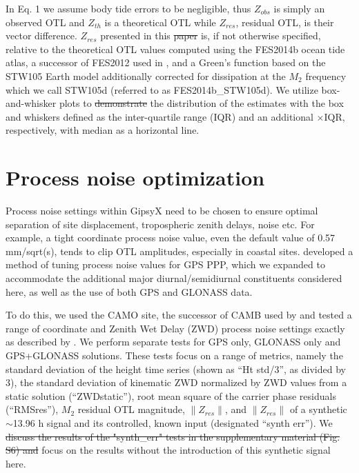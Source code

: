 \documentclass[se, manuscript]{copernicus}
\providecommand{\DIFadd}[1]{{\protect\color{blue}\uwave{#1}}} %
\providecommand{\DIFdel}[1]{{\protect\color{red}\sout{#1}}}                      %
\providecommand{\DIFaddbegin}{} %
\providecommand{\DIFaddend}{} %
\providecommand{\DIFdelbegin}{} %
\providecommand{\DIFdelend}{} %
\begin{document}
In Eq. 1 we assume body tide errors to be negligible, thus $Z_{obs}$ is simply an observed OTL and $Z_{th}$ is a theoretical OTL while $Z_{res}$, \DIFaddbegin \DIFadd{the }\DIFaddend residual OTL, is their vector difference. $Z_{res}$ presented in this \DIFdelbegin \DIFdel{paper }\DIFdelend \DIFaddbegin \DIFadd{publication }\DIFaddend is, if not otherwise specified, relative to the theoretical OTL values computed using the FES2014b ocean tide atlas, a successor of FES2012 used in \cite{Bos2015}, and a Green’s function based on the STW105 Earth model additionally corrected for dissipation at the $M_2$ frequency which we call STW105d (referred to as FES2014b\_STW105d). We utilize box-and-whisker plots to \DIFdelbegin \DIFdel{demonstrate }\DIFdelend \DIFaddbegin \DIFadd{visualise }\DIFaddend the distribution of the estimates with the box and whiskers defined as the inter-quartile range (IQR) and an additional $\times \text{IQR}$, respectively, with \DIFaddbegin \DIFadd{the }\DIFaddend median as a horizontal line.

\section{Process noise optimization}
Process noise settings within GipsyX need to be chosen to ensure optimal separation of site displacement, tropospheric zenith delays, noise etc. For example, a tight coordinate process noise value, even the default value of 0.57 mm/sqrt(s), tends to clip OTL amplitudes, especially in coastal sites. \cite{Penna2015} developed a method of tuning process noise values for GPS PPP, which we expanded to accommodate the additional major diurnal/semidiurnal constituents considered here, as well as the use of both GPS and GLONASS data.

To do this, we used the CAMO site, the successor of CAMB used by \cite{Penna2015} and tested a range of coordinate and Zenith Wet Delay (ZWD) process noise settings exactly as described by \cite{Penna2015}. We perform separate tests for GPS only, GLONASS only and GPS+GLONASS solutions. These tests focus on a range of metrics, namely the standard deviation of the height time series (shown as “Ht std/3”, as divided by 3), the standard deviation of kinematic ZWD normalized by ZWD values from a static solution (“ZWDstatic”), root mean square of the carrier phase residuals (“RMSres”), $M_2$ residual OTL magnitude, $\|Z_{res}\|$, and $\|Z_{res}\|$ of a synthetic $\sim$13.96 h signal and its controlled, known input (designated “synth err”). We \DIFdelbegin \DIFdel{discuss the results of the "synth\_err" tests in the supplementary material (Fig. S6) and }\DIFdelend focus on the results without the introduction of this synthetic signal here.
\end{document}
